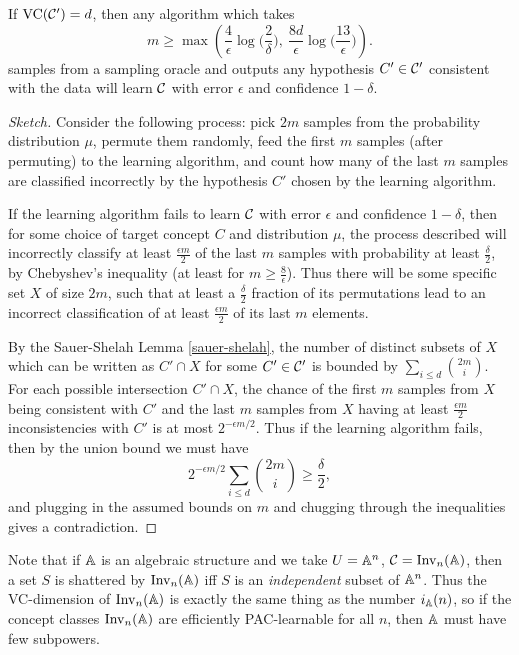 \documentclass[letterpaper,11pt]{article}
\DeclareMathOperator{\Inv}{Inv}
\begin{document}
\begin{thm} If $\operatorname{VC}(\mathcal{C}') = d$, then any algorithm which takes
\[
m \ge \max\left(\frac{4}{\epsilon}\log\Big(\frac{2}{\delta}\Big),\ \frac{8d}{\epsilon}\log\Big(\frac{13}{\epsilon}\Big)\right).%
\]
samples from a sampling oracle and outputs any hypothesis $C' \in \mathcal{C}'$ consistent with the data will learn $\mathcal{C}$ with error $\epsilon$ and confidence $1-\delta$.
\end{thm}
\begin{proof}[Sketch] Consider the following process: pick $2m$ samples from the probability distribution $\mu$, permute them randomly, feed the first $m$ samples (after permuting) to the learning algorithm, and count how many of the last $m$ samples are classified incorrectly by the hypothesis $C'$ chosen by the learning algorithm.

If the learning algorithm fails to learn $\mathcal{C}$ with error $\epsilon$ and confidence $1-\delta$, then for some choice of target concept $C$ and distribution $\mu$, the process described will incorrectly classify at least $\frac{\epsilon m}{2}$ of the last $m$ samples with probability at least $\frac{\delta}{2}$, by Chebyshev's inequality (at least for $m \ge \frac{8}{\epsilon}$). Thus there will be some specific set $X$ of size $2m$, such that at least a $\frac{\delta}{2}$ fraction of its permutations lead to an incorrect classification of at least $\frac{\epsilon m}{2}$ of its last $m$ elements.

By the Sauer-Shelah Lemma \ref{sauer-shelah}, the number of distinct subsets of $X$ which can be written as $C' \cap X$ for some $C' \in \mathcal{C}'$ is bounded by $\sum_{i \le d} \binom{2m}{i}$. For each possible intersection $C' \cap X$, the chance of the first $m$ samples from $X$ being consistent with $C'$ and the last $m$ samples from $X$ having at least $\frac{\epsilon m}{2}$ inconsistencies with $C'$ is at most $2^{-\epsilon m/2}$. Thus if the learning algorithm fails, then by the union bound we must have
\[
2^{-\epsilon m/2}\sum_{i \le d} \binom{2m}{i} \ge \frac{\delta}{2},
\]
and plugging in the assumed bounds on $m$ and chugging through the inequalities gives a contradiction.
\end{proof}

Note that if $\mathbb{A}$ is an algebraic structure and we take $U = \mathbb{A}^n$, $\cC = \Inv_n(\bA)$, then a set $S$ is shattered by $\Inv_n(\bA)$ iff $S$ is an \emph{independent} subset of $\mathbb{A}^n$. Thus the VC-dimension of $\Inv_n(\bA)$ is exactly the same thing as the number $i_{\mathbb{A}}(n)$, so if the concept classes $\Inv_n(\bA)$ are efficiently PAC-learnable for all $n$, then $\mathbb{A}$ must have few subpowers.
\end{document}

